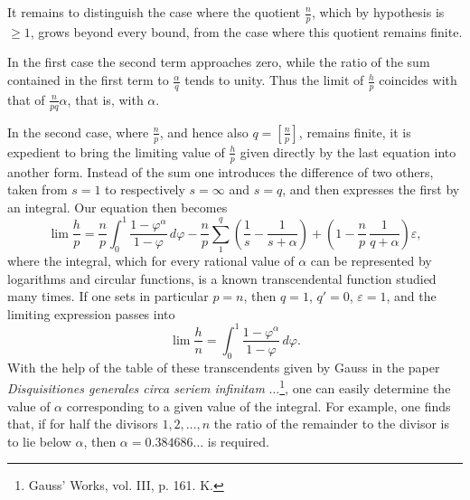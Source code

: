 \documentclass[11pt]{article}
\newcommand{\floor}[1]{\left[#1\right]}
\begin{document}
It remains to distinguish the case where the quotient $\frac np$, which by hypothesis is $\geq1$, grows beyond every bound, from the case where this quotient remains finite.

In the first case the second term approaches zero, while the ratio of the sum contained in the first term to $\frac{\alpha}{q}$ tends to unity. Thus the limit of $\frac hp$ coincides with that of $\frac n{pq}\alpha$, that is, with $\alpha$.

In the second case, where $\frac np$, and hence also $q=\floor{\frac np}$, remains finite, it is expedient to bring the limiting value of $\frac hp$ given directly by the last equation into another form. Instead of the sum one introduces the difference of two others, taken from $s=1$ to respectively $s=\infty$ and $s=q$, and then expresses the first by an integral. Our equation then becomes
\[
 \lim\frac hp=\frac np\int_0^1\frac{1-\varphi^\alpha}{1-\varphi}\,d\varphi
 -\frac np\sum_1^q\left(\frac1s-\frac1{s+\alpha}\right)
 +\left(1-\frac np\,\frac1{q+\alpha}\right)\varepsilon,
\]
where the integral, which for every rational value of $\alpha$ can be represented by logarithms and circular functions, is a known transcendental function studied many times. If one sets in particular $p=n$, then $q=1$, $q'=0$, $\varepsilon=1$, and the limiting expression passes into
\[
 \lim\frac hn=\int_0^1\frac{1-\varphi^\alpha}{1-\varphi}\,d\varphi.
\]
With the help of the table of these transcendents given by Gauss in the paper \emph{Disquisitiones generales circa seriem infinitam} $\ldots$\footnote{Gauss' Works, vol. III, p. 161. K.}, one can easily determine the value of $\alpha$ corresponding to a given value of the integral. For example, one finds that, if for half the divisors $1,2,\ldots,n$ the ratio of the remainder to the divisor is to lie below $\alpha$, then $\alpha=0.384686\ldots$ is required.
\end{document}
